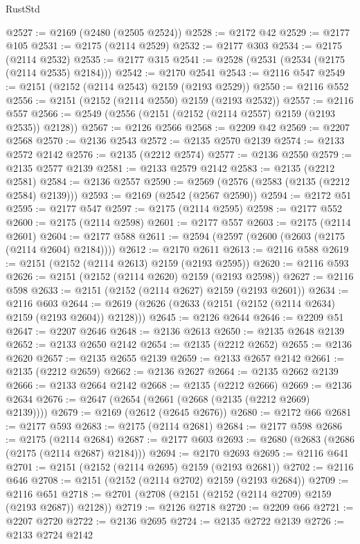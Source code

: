 \begin{lexlean}{RustStd}
\begin{coremodule}
{\begin{coremodule}
{{{{{{{{{{{{{{{{@2527 := @2169 (@2480 (@2505 @2524))
@2528 := @2172 @42
@2529 := @2177 @105
@2531 := @2175 (@2114 @2529)
@2532 := @2177 @303
@2534 := @2175 (@2114 @2532)
@2535 := @2177 @315
@2541 := @2528 (@2531 (@2534 (@2175 (@2114 @2535) @2184)))
@2542 := @2170 @2541
@2543 := @2116 @547
@2549 := @2151 (@2152 (@2114 @2543) @2159 (@2193 @2529))
@2550 := @2116 @552
@2556 := @2151 (@2152 (@2114 @2550) @2159 (@2193 @2532))
@2557 := @2116 @557
@2566 := @2549 (@2556 (@2151 (@2152 (@2114 @2557) @2159 (@2193 @2535)) @2128))
@2567 := @2126 @2566
@2568 := @2209 @42
@2569 := @2207 @2568
@2570 := @2136 @2543
@2572 := @2135 @2570 @2139
@2574 := @2133 @2572 @2142
@2576 := @2135 (@2212 @2574)
@2577 := @2136 @2550
@2579 := @2135 @2577 @2139
@2581 := @2133 @2579 @2142
@2583 := @2135 (@2212 @2581)
@2584 := @2136 @2557
@2590 := @2569 (@2576 (@2583 (@2135 (@2212 @2584) @2139)))
@2593 := @2169 (@2542 (@2567 @2590))
@2594 := @2172 @51
@2595 := @2177 @547
@2597 := @2175 (@2114 @2595)
@2598 := @2177 @552
@2600 := @2175 (@2114 @2598)
@2601 := @2177 @557
@2603 := @2175 (@2114 @2601)
@2604 := @2177 @588
@2611 := @2594 (@2597 (@2600 (@2603 (@2175 (@2114 @2604) @2184))))
@2612 := @2170 @2611
@2613 := @2116 @588
@2619 := @2151 (@2152 (@2114 @2613) @2159 (@2193 @2595))
@2620 := @2116 @593
@2626 := @2151 (@2152 (@2114 @2620) @2159 (@2193 @2598))
@2627 := @2116 @598
@2633 := @2151 (@2152 (@2114 @2627) @2159 (@2193 @2601))
@2634 := @2116 @603
@2644 := @2619 (@2626 (@2633 (@2151 (@2152 (@2114 @2634) @2159 (@2193 @2604)) @2128)))
@2645 := @2126 @2644
@2646 := @2209 @51
@2647 := @2207 @2646
@2648 := @2136 @2613
@2650 := @2135 @2648 @2139
@2652 := @2133 @2650 @2142
@2654 := @2135 (@2212 @2652)
@2655 := @2136 @2620
@2657 := @2135 @2655 @2139
@2659 := @2133 @2657 @2142
@2661 := @2135 (@2212 @2659)
@2662 := @2136 @2627
@2664 := @2135 @2662 @2139
@2666 := @2133 @2664 @2142
@2668 := @2135 (@2212 @2666)
@2669 := @2136 @2634
@2676 := @2647 (@2654 (@2661 (@2668 (@2135 (@2212 @2669) @2139))))
@2679 := @2169 (@2612 (@2645 @2676))
@2680 := @2172 @66
@2681 := @2177 @593
@2683 := @2175 (@2114 @2681)
@2684 := @2177 @598
@2686 := @2175 (@2114 @2684)
@2687 := @2177 @603
@2693 := @2680 (@2683 (@2686 (@2175 (@2114 @2687) @2184)))
@2694 := @2170 @2693
@2695 := @2116 @641
@2701 := @2151 (@2152 (@2114 @2695) @2159 (@2193 @2681))
@2702 := @2116 @646
@2708 := @2151 (@2152 (@2114 @2702) @2159 (@2193 @2684))
@2709 := @2116 @651
@2718 := @2701 (@2708 (@2151 (@2152 (@2114 @2709) @2159 (@2193 @2687)) @2128))
@2719 := @2126 @2718
@2720 := @2209 @66
@2721 := @2207 @2720
@2722 := @2136 @2695
@2724 := @2135 @2722 @2139
@2726 := @2133 @2724 @2142
}}}}}}}}}}}}}}}}
\end{coremodule}}
\end{coremodule}
\end{lexlean}
